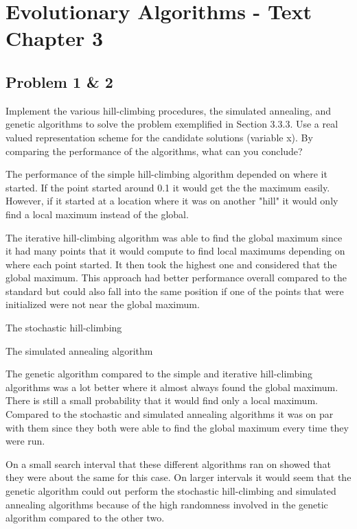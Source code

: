 
\chapter{Evolutionary Algorithms - Text Chapter 3}

\section{Problem 1 & 2}


Implement the various hill-climbing procedures, the simulated annealing, and genetic algorithms to solve the problem exemplified in Section 3.3.3. Use a real valued representation scheme for the candidate solutions (variable x).
\newline
\newline
{\setlength{\parindent}{0cm} By comparing the performance of the algorithms, what can you conclude?}
\newline
\par
	The performance of the simple hill-climbing algorithm depended on where it started. If the point started around 0.1 it would get the the maximum easily. However, if it started at a location where it was on another "hill" it would only find a local maximum instead of the global. 
\par
	The iterative hill-climbing algorithm was able to find the global maximum since it had many points that it would compute to find local maximums depending on where each point started. It then took the highest one and considered that the global maximum. This approach had better performance overall compared to the standard but could also fall into the same position if one of the points that were initialized were not near the global maximum.
\par
	The stochastic hill-climbing
\par
	The simulated annealing algorithm
\par
	The genetic algorithm  compared to the simple and iterative hill-climbing algorithms was a lot better where it almost always found the global maximum. There is still a small probability that it would find only a local maximum. Compared to the stochastic and simulated annealing algorithms it was on par with them since they both were able to find the global maximum every time they were run.
	\par
	On a small search interval that these different algorithms ran on showed that they were about the same for this case. On larger intervals it would seem that the genetic algorithm could out perform the stochastic hill-climbing and simulated annealing algorithms because of the high randomness involved in the genetic algorithm compared to the other two.
	\newline
	\newline
	
